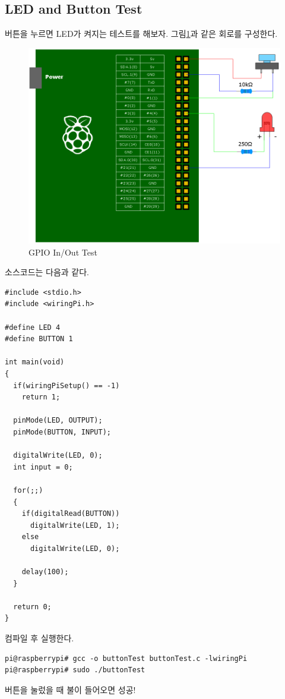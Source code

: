 \documentclass[11pt
  , a4paper
  , article
  , oneside
]{memoir}
\begin{document}
\subsection{LED and Button Test}
버튼을 누르면 LED가 켜지는 테스트를 해보자. 그림\ref{fig:gpio_in_out}과 같은 회로를 구성한다.
\begin{figure}[!htb]
\centering
\includegraphics[width=1\textwidth]{./images/raspberry/ledbuttontest.png}
\caption{GPIO In/Out Test}
\label{fig:gpio_in_out}
\end{figure}
소스코드는 다음과 같다.
\begin{lstlisting}[style=termstylenumber, caption={gpio.c}, label={list:gpioTestCode}]
#include <stdio.h>
#include <wiringPi.h>

#define LED 4
#define BUTTON 1

int main(void)
{
  if(wiringPiSetup() == -1)
    return 1;

  pinMode(LED, OUTPUT);
  pinMode(BUTTON, INPUT);

  digitalWrite(LED, 0);
  int input = 0;

  for(;;)
  {
    if(digitalRead(BUTTON))
      digitalWrite(LED, 1);
    else
      digitalWrite(LED, 0); 

    delay(100);
  }

  return 0;
}
\end{lstlisting}
컴파일 후 실행한다.
\begin{lstlisting}[style=termstyle]
pi@raspberrypi# gcc -o buttonTest buttonTest.c -lwiringPi
pi@raspberrypi# sudo ./buttonTest
\end{lstlisting}
버튼을 눌렀을 때 불이 들어오면 성공!
\end{document}
